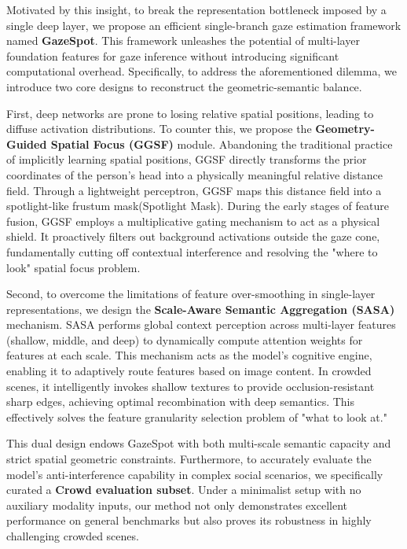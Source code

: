 \documentclass[sigconf,review,anonymous,screen]{acmart}
\begin{document}
Motivated by this insight, to break the representation bottleneck imposed by a single deep layer, we propose an efficient single-branch gaze estimation framework named \textbf{GazeSpot}. This framework unleashes the potential of multi-layer foundation features for gaze inference without introducing significant computational overhead. Specifically, to address the aforementioned dilemma, we introduce two core designs to reconstruct the geometric-semantic balance.

First, deep networks are prone to losing relative spatial positions, leading to diffuse activation distributions. To counter this, we propose the \textbf{Geometry-Guided Spatial Focus (GGSF)} module. Abandoning the traditional practice of implicitly learning spatial positions, GGSF directly transforms the prior coordinates of the person's head into a physically meaningful relative distance field. Through a lightweight perceptron, GGSF maps this distance field into a spotlight-like frustum mask(Spotlight Mask). During the early stages of feature fusion, GGSF employs a multiplicative gating mechanism to act as a physical shield. It proactively filters out background activations outside the gaze cone, fundamentally cutting off contextual interference and resolving the "where to look" spatial focus problem.

Second, to overcome the limitations of feature over-smoothing in single-layer representations, we design the \textbf{Scale-Aware Semantic Aggregation (SASA)} mechanism. SASA performs global context perception across multi-layer features (shallow, middle, and deep) to dynamically compute attention weights for features at each scale. This mechanism acts as the model's cognitive engine, enabling it to adaptively route features based on image content. In crowded scenes, it intelligently invokes shallow textures to provide occlusion-resistant sharp edges, achieving optimal recombination with deep semantics. This effectively solves the feature granularity selection problem of "what to look at."

This dual design endows GazeSpot with both multi-scale semantic capacity and strict spatial geometric constraints. Furthermore, to accurately evaluate the model's anti-interference capability in complex social scenarios, we specifically curated a \textbf{Crowd evaluation subset}. Under a minimalist setup with no auxiliary modality inputs, our method not only demonstrates excellent performance on general benchmarks but also proves its robustness in highly challenging crowded scenes.
\end{document}
